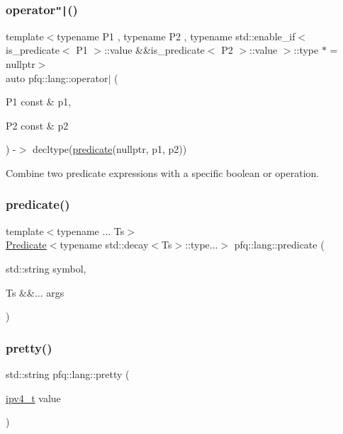 \subsubsection{\texorpdfstring{operator\texttt{"|}()}{operator|()}}
{\footnotesize\ttfamily template$<$typename P1 , typename P2 , typename std\+::enable\+\_\+if$<$ is\+\_\+predicate$<$ P1 $>$\+::value \&\&is\+\_\+predicate$<$ P2 $>$\+::value $>$\+::type $\ast$  = nullptr$>$ \\
auto pfq\+::lang\+::operator$\vert$ (\begin{DoxyParamCaption}\item[{P1 const \&}]{p1,  }\item[{P2 const \&}]{p2 }\end{DoxyParamCaption}) -\/$>$ decltype(\hyperlink{namespacepfq_1_1lang_aca9adafc436b7f851621b979fa1aaf88}{predicate}(nullptr, p1, p2))
    \hspace{0.3cm}{\ttfamily [inline]}}



Combine two predicate expressions with a specific boolean \textquotesingle{}or\textquotesingle{} operation. 

\mbox{\label{namespacepfq_1_1lang_aca9adafc436b7f851621b979fa1aaf88}} 
\subsubsection{\texorpdfstring{predicate()}{predicate()}}
{\footnotesize\ttfamily template$<$typename ... Ts$>$ \\
\hyperlink{structpfq_1_1lang_1_1Predicate}{Predicate}$<$typename std\+::decay$<$Ts$>$\+::type...$>$ pfq\+::lang\+::predicate (\begin{DoxyParamCaption}\item[{std\+::string}]{symbol,  }\item[{Ts \&\&...}]{args }\end{DoxyParamCaption})}

\mbox{\label{namespacepfq_1_1lang_a7a4c9ec62feae5479366427beeff5b74}} 
\subsubsection{\texorpdfstring{pretty()}{pretty()}\hspace{0.1cm}{\footnotesize\ttfamily [1/7]}}
{\footnotesize\ttfamily std\+::string pfq\+::lang\+::pretty (\begin{DoxyParamCaption}\item[{\hyperlink{structpfq_1_1lang_1_1ipv4__t}{ipv4\+\_\+t}}]{value }\end{DoxyParamCaption})\hspace{0.3cm}{\ttfamily [inline]}}

